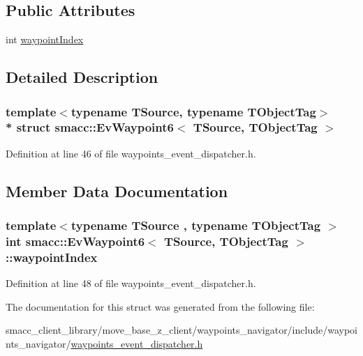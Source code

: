 \subsection*{Public Attributes}
\begin{DoxyCompactItemize}
\item 
int \hyperlink{structsmacc_1_1EvWaypoint6_aa7eb6bd30fcd9c46681e391a1968a2e7}{waypoint\+Index}
\end{DoxyCompactItemize}


\subsection{Detailed Description}
\subsubsection*{template$<$typename T\+Source, typename T\+Object\+Tag$>$\\*
struct smacc\+::\+Ev\+Waypoint6$<$ T\+Source, T\+Object\+Tag $>$}



Definition at line 46 of file waypoints\+\_\+event\+\_\+dispatcher.\+h.



\subsection{Member Data Documentation}
\subsubsection[{\texorpdfstring{waypoint\+Index}{waypointIndex}}]{\setlength{\rightskip}{0pt plus 5cm}template$<$typename T\+Source , typename T\+Object\+Tag $>$ int {\bf smacc\+::\+Ev\+Waypoint6}$<$ T\+Source, T\+Object\+Tag $>$\+::waypoint\+Index}\hypertarget{structsmacc_1_1EvWaypoint6_aa7eb6bd30fcd9c46681e391a1968a2e7}{}\label{structsmacc_1_1EvWaypoint6_aa7eb6bd30fcd9c46681e391a1968a2e7}


Definition at line 48 of file waypoints\+\_\+event\+\_\+dispatcher.\+h.



The documentation for this struct was generated from the following file\+:\begin{DoxyCompactItemize}
\item 
smacc\+\_\+client\+\_\+library/move\+\_\+base\+\_\+z\+\_\+client/waypoints\+\_\+navigator/include/waypoints\+\_\+navigator/\hyperlink{waypoints__event__dispatcher_8h}{waypoints\+\_\+event\+\_\+dispatcher.\+h}\end{DoxyCompactItemize}
